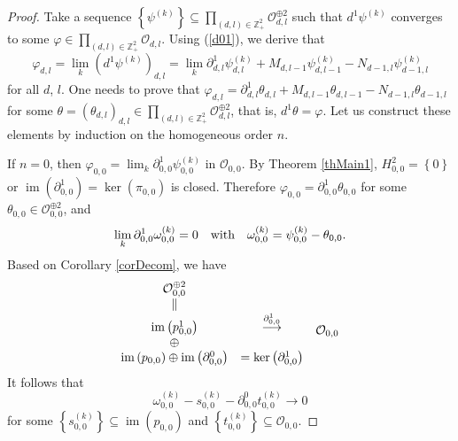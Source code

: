 \documentclass[12pt,reqno]{amsart}%
\theoremstyle{plain}
\numberwithin{theorem}{section} \numberwithin{equation}{section}
\numberwithin{lemma}{section}
\numberwithin{remark}{section}
\numberwithin{example}{section}
\numberwithin{proposition}{section}
\numberwithin{definition}{section}
\numberwithin{corollary}{section}
\begin{document}
\begin{proof}
Take a sequence $\left\{  \psi^{\left(  k\right)  }\right\}  \subseteq
\prod\limits_{\left(  d,l\right)  \in\mathbb{Z}_{+}^{2}}\mathcal{O}%
_{d,l}^{\oplus2}$ such that $d^{1}\psi^{\left(  k\right)  }$ converges to some
$\varphi\in\prod\limits_{\left(  d,l\right)  \in\mathbb{Z}_{+}^{2}}%
\mathcal{O}_{d,l}$. Using (\ref{d01}), we derive that
\begin{equation}
\varphi_{d,l}=\lim_{k}\left(  d^{1}\psi^{\left(  k\right)  }\right)
_{d,l}=\lim_{k}\partial_{d,l}^{1}\psi_{d,l}^{\left(  k\right)  }+M_{d,l-1}%
\psi_{d,l-1}^{\left(  k\right)  }-N_{d-1,l}\psi_{d-1,l}^{\left(  k\right)  }
\label{fi1}%
\end{equation}
for all $d$, $l$. One needs to prove that $\varphi_{d,l}=\partial_{d,l}%
^{1}\theta_{d,l}+M_{d,l-1}\theta_{d,l-1}-N_{d-1,l}\theta_{d-1,l}$ for some
$\theta=\left(  \theta_{d,l}\right)  _{d,l}\in\prod\limits_{\left(
d,l\right)  \in\mathbb{Z}_{+}^{2}}\mathcal{O}_{d,l}^{\oplus2}$, that is,
$d^{1}\theta=\varphi$. Let us construct these elements by induction on the
homogeneous order $n$.

If $n=0$, then $\varphi_{0,0}=\lim_{k}\partial_{0,0}^{1}\psi_{0,0}^{\left(
k\right)  }$ in $\mathcal{O}_{0,0}$. By Theorem \ref{thMain1}, $H_{0,0}%
^{2}=\left\{  0\right\}  $ or $\operatorname{im}\left(  \partial_{0,0}%
^{1}\right)  =\ker\left(  \pi_{0,0}\right)  $ is closed. Therefore
$\varphi_{0,0}=\partial_{0,0}^{1}\theta_{0,0}$ for some $\theta_{0,0}%
\in\mathcal{O}_{0,0}^{\oplus2}$, and
\[
\lim_{k}\partial_{0,0}^{1}\omega_{0,0}^{\left(  k\right)  }=0\quad
\text{with\quad}\omega_{0,0}^{\left(  k\right)  }=\psi_{0,0}^{\left(
k\right)  }-\theta_{0,0}.
\]
Based on Corollary \ref{corDecom}, we have
\[%
\begin{array}
[c]{cc}%
\mathcal{O}_{0,0}^{\oplus2} & \\
\parallel & \\
\operatorname{im}\left(  p_{0,0}^{1}\right)  & \overset{\partial_{0,0}%
^{1}}{\longrightarrow}\\
\oplus & \\
\operatorname{im}\left(  p_{0,0}\right)  \oplus\operatorname{im}\left(
\partial_{0,0}^{0}\right)  & =\ker\left(  \partial_{0,0}^{1}\right)
\end{array}%
\begin{array}
[c]{c}%
\\
\\
\mathcal{O}_{0,0}\\
\\
\end{array}
\]
It follows that
\begin{equation}
\omega_{0,0}^{\left(  k\right)  }-s_{0,0}^{\left(  k\right)  }-\partial
_{0,0}^{0}t_{0,0}^{\left(  k\right)  }\rightarrow0 \label{fi12}%
\end{equation}
for some $\left\{  s_{0,0}^{\left(  k\right)  }\right\}  \subseteq
\operatorname{im}\left(  p_{0,0}\right)  $ and $\left\{  t_{0,0}^{\left(
k\right)  }\right\}  \subseteq\mathcal{O}_{0,0}$.


\end{proof}
\end{document}
